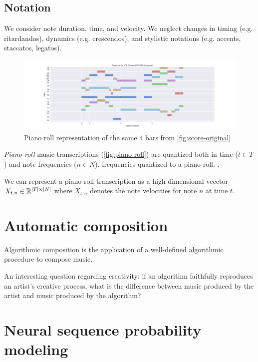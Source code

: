 \subsection{Notation}

We consider note duration, time, and velocity. We neglect changes in timing
(e.g. ritardandos), dynamics (e.g. crescendos), and stylistic notations (e.g.
accents, staccatos, legatos).

\begin{figure}[htpb]
    \centering
    \includegraphics[width=1.0\linewidth]{Figures/bwv133-6-original-piano-roll.png}
    \caption{Piano roll representation of the same 4 bars from \autoref{fig:score-original}}
    \label{fig:piano-roll-original}
\end{figure}

\emph{Piano roll} music transcriptions (\autoref{fig:piano-roll}) are quantized
both in time ($t \in T$) and note frequencies ($n \in N$). frequencies
quantized to a piano roll. .

We can represent a piano roll transcription as a high-dimensional vecctor
$X_{t,n} \in \mathbb{R}^{|T| \times |N|}$ where $X_{t,n}$ denotes the note
velocities for note $n$ at time $t$.

\section{Automatic composition}

Algorithmic composition is the application of a well-defined algorithmic
procedure to compose music.

An interesting question regarding creativity: if an algorithm faithfully reproduces
an artist's creative process, what is the difference between music produced by the artist
and music produced by the algorithm?

\section{Neural sequence probability modeling}


